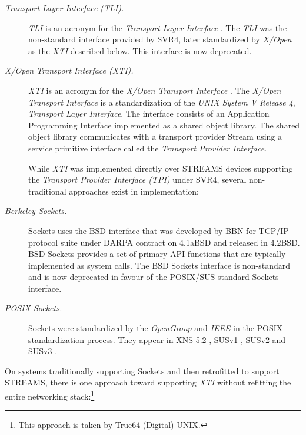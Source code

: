 \documentclass[letterpaper,final,notitlepage,twocolumn,10pt,twoside]{article}
\begin{document}
\begin{description}

\item[{\it Transport Layer Interface (TLI).}]

\textsl{TLI} is an acronym for the \textit{Transport Layer Interface} \cite[]{tli}.  The
\textsl{TLI} was the non-standard interface provided by SVR4, later standardized by \textit{X/Open}
as the \textsl{XTI} described below.  This interface is now deprecated.

\item[{\it X/Open Transport Interface (XTI).}]

\textsl{XTI} is an acronym for the \textsl{X/Open Transport Interface} \cite[]{xti}.  The
\textsl{X/Open Transport Interface} is a standardization of the \textsl{UNIX System V Release 4},
\textsl{Transport Layer Interface}.  The interface consists of an Application Programming Interface
implemented as a shared object library.  The shared object library communicates with a transport
provider Stream using a service primitive interface called the \textsl{Transport Provider
Interface}.

While \textsl{XTI} was implemented directly over STREAMS devices supporting the \textit{Transport
Provider Interface (TPI)} \cite[]{tpi} under SVR4, several non-traditional approaches exist in
implementation:

\item[{\it Berkeley Sockets.}]

Sockets uses the BSD interface that was developed by BBN for TCP/IP protocol suite under DARPA
contract on 4.1aBSD and released in 4.2BSD.  BSD Sockets provides a set of primary API functions
that are typically implemented as system calls.  The BSD Sockets interface is non-standard and is
now deprecated in favour of the POSIX/SUS standard Sockets interface.

\item[{\it POSIX Sockets.}]

Sockets were standardized by the \textit{OpenGroup} \cite[]{opengroup} and \textit{IEEE} in the
POSIX standardization process.  They appear in XNS 5.2 \cite[]{xns}, SUSv1 \cite[]{susv1}, SUSv2
\cite[]{susv2} and SUSv3 \cite[]{susv3}.

\end{description}

On systems traditionally supporting Sockets and then retrofitted to support STREAMS, there is one
approach toward supporting \textsl{XTI} without refitting the entire networking stack:\footnote{This
approach is taken by True64 (Digital) UNIX.}
\end{document}
